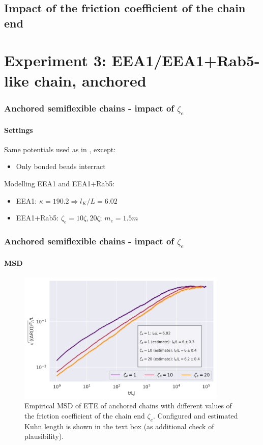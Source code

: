 \documentclass[handout]{beamer}
\begin{document}
\subsection{Impact of the friction coefficient of the chain end}


\section{Experiment 3: EEA1/EEA1+Rab5-like chain, anchored}

\begin{frame}
    \frametitle{Anchored semiflexible chains - impact of $\zeta_e$}
    \framesubtitle{Settings}
    Same potentials used as in \cite[Section 2.1]{svaneborg_2020}, except:
    \begin{itemize}
        \item Only bonded beads interract
    \end{itemize}
    Modelling EEA1 and EEA1+Rab5:
    \begin{itemize}
        \item EEA1: $\kappa = 190.2 \Rightarrow l_K/L=6.02$ 
        \item EEA1+Rab5: $\zeta_e = 10\zeta, 20\zeta$; $m_e=1.5m$
    \end{itemize}
\end{frame}


\begin{frame}
    \frametitle{Anchored semiflexible chains - impact of $\zeta_e$}
    \framesubtitle{MSD}
    \begin{figure}[h]
        \includegraphics[width=10cm]{./14+15+16-exp-msd-log.png}
        \caption{Empirical MSD of ETE of anchored chains with different values of the friction
        coefficient of the chain end $\zeta_e$. Configured and estimated Kuhn length is shown in the text
        box (as additional check of plausibility).}
    \end{figure}
\end{frame}
\end{document}
